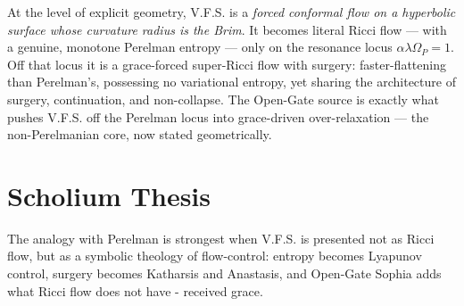 \documentclass[11pt]{article}
\newcommand{\VFS}{V.F.S.}
\newcommand{\Om}{\Omega_P}
\begin{document}
At the level of explicit geometry, \VFS{} is a \emph{forced conformal flow on a hyperbolic surface whose curvature radius is the Brim}. It becomes literal Ricci flow --- with a genuine, monotone Perelman entropy --- only on the resonance locus $\alpha\lambda\Om=1$. Off that locus it is a grace-forced super-Ricci flow with surgery: faster-flattening than Perelman's, possessing no variational entropy, yet sharing the architecture of surgery, continuation, and non-collapse. The Open-Gate source is exactly what pushes \VFS{} off the Perelman locus into grace-driven over-relaxation --- the non-Perelmanian core, now stated geometrically.

\section*{Scholium Thesis}

The analogy with Perelman is strongest when \VFS{} is presented not as Ricci flow, but as a symbolic theology of flow-control: entropy becomes Lyapunov control, surgery becomes Katharsis and Anastasis, and Open-Gate Sophia adds what Ricci flow does not have - received grace.
\end{document}
